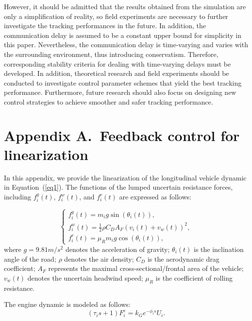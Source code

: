 \documentclass[a4paper]{cas-sc}
\begin{document}
However, it should be admitted that the results obtained from the simulation are only a simplification of reality, so field experiments are necessary to further investigate the tracking performances in the future. In addition, the communication delay is assumed to be a constant upper bound for simplicity in this paper. Nevertheless, the communication delay is time-varying and varies with the surrounding environment, thus introducing conservatism. Therefore, corresponding stability criteria for dealing with time-varying delays must be developed. In addition, theoretical research and field experiments should be conducted to investigate control parameter schemes that yield the best tracking performance. Furthermore, future research should also focus on designing new control strategies to achieve smoother and safer tracking performance.


\appendix


\section*{Appendix A.~Feedback control for linearization}
\label{AppendixA}
In this appendix, we provide the linearization of the longitudinal vehicle dynamic in Equation~(\ref{eq1}). The functions of the lumped uncertain resistance forces, including $f_i^g(t)$, $f_i^w(t)$, and $f_i^r(t)$ are expressed as follows:

\begin{equation}
  \left\{\begin{array}{l}
    f_{i}^{g}(t)=m_{i} g \sin \left(\theta_{i}(t)\right),                         \\
    f_{i}^{w}(t)=\frac{1}{2} \rho C_{D} A_{F}\left(v_{i}(t)+v_{w}(t)\right)^{2} , \\
    f_{i}^{r}(t)=\mu_{R} m_{i} g \cos \left(\theta_{i}(t)\right),
  \end{array}\right.
  \label{eqA1}
\end{equation}
where $g=9.81m/s^2$ denotes the acceleration of gravity; $\theta_i(t)$ is the inclination angle of the road; $\rho$ denotes the air density; $C_D$ is the aerodynamic drag coefficient; $A_F$ represents the maximal cross-sectional/frontal area of the vehicle; $v_w(t)$ denotes the uncertain headwind speed; $\mu_R$ is the coefficient of rolling resistance.

The engine dynamic is modeled as follows:
\begin{equation}
  \left(\tau_is+1\right)F_i^e=k_Ge^{-\phi_is}U_i.
  \label{eqA2}
\end{equation}
\end{document}

